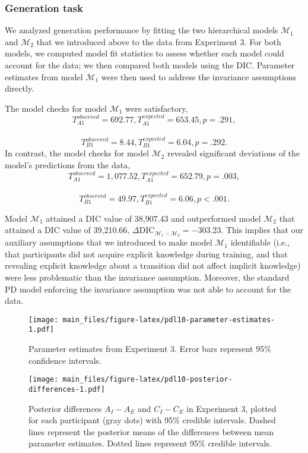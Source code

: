 \documentclass[english,,man]{apa6}
\begin{document}
\hypertarget{generation-task-2}{%
\subsubsection{Generation task}\label{generation-task-2}}

We analyzed generation performance by fitting the two hierarchical models \(\mathcal{M}_1\) and \(\mathcal{M}_2\) that we introduced above to the data from Experiment 3.
For both models, we computed model fit statistics to assess whether each model could account for the data;
we then compared both models using the DIC.
Parameter estimates from model \(\mathcal{M}_1\) were then used to address the invariance assumptions directly.

The model checks for model \(\mathcal{M}_1\) were satisfactory,
\[T_{A1}^{observed} = 692.77, T_{A1}^{expected} = 653.45, p = .291,\]~ \[T_{B1}^{observed} = 8.44, T_{B1}^{expected} = 6.04, p = .292.\]
In contrast, the model checks for model \(\mathcal{M}_2\) revealed significant deviations of the model's predictions from the data,
\[T_{A1}^{observed} = 1,077.52, T_{A1}^{expected} = 652.79, p = .003,\]~ \[T_{B1}^{observed} = 49.97, T_{B1}^{expected} = 6.06, p < .001.\]

Model \(\mathcal{M}_1\) attained a DIC value of 38,907.43 and outperformed model \(\mathcal{M}_2\) that attained a DIC value of 39,210.66, \(\Delta \textrm{DIC}_{\mathcal{M}_1 - \mathcal{M}_2} = -303.23\).
This implies that our auxiliary assumptions that we introduced to make model \(\mathcal{M}_1\) identifiable (i.e., that participants did not acquire explicit knowledge during training, and that revealing explicit knowledge about a transition did not affect implicit knowledge) were less problematic than the invariance assumption.
Moreover, the standard PD model enforcing the invariance assumption was not able to account for the data.

\begin{figure}
\centering
\texttt{[image: main\_files/figure-latex/pdl10-parameter-estimates-1.pdf]}
\caption{\label{fig:pdl10-parameter-estimates}Parameter estimates from Experiment 3. Error bars represent 95\% confidence intervals.}
\end{figure}

\begin{figure}
\centering
\texttt{[image: main\_files/figure-latex/pdl10-posterior-differences-1.pdf]}
\caption{\label{fig:pdl10-posterior-differences}Posterior differences \(A_I - A_E\) and \(C_I - C_E\) in Experiment 3, plotted for each participant (gray dots) with 95\% credible intervals. Dashed lines represent the posterior means of the differences between mean parameter estimates. Dotted lines represent 95\% credible intervals.}
\end{figure}
\end{document}
